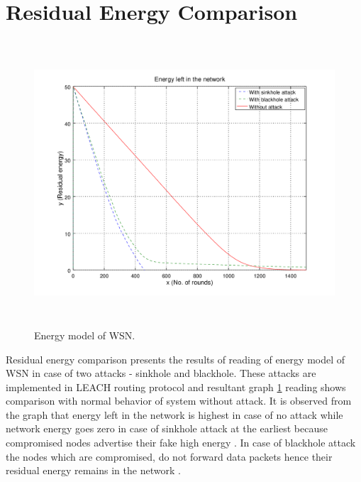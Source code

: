 \section{Residual Energy Comparison}
    \begin{figure}[ht]
     \centering
     \includegraphics[width=5in, height=4.2in] {Figures/PNG/energy.png}
     \caption{Energy model of WSN.}
     \label{energy}
    \end{figure}
Residual energy comparison presents the results of reading of energy model of WSN in case of two attacks - sinkhole and blackhole. These attacks are implemented in LEACH routing protocol and resultant graph \ref{energy} reading shows comparison with normal behavior of system without attack. It is observed from the graph that energy left in the network is highest in case of no attack while network energy goes zero in case of sinkhole attack at the earliest because compromised nodes advertise their fake high energy \cite{salehi2013detection}. In case of blackhole attack the nodes which are compromised, do not forward data packets hence their residual energy remains in the network \cite{wazid2013detection}.  
